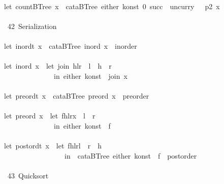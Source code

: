 \documentclass[a4paper]{article}
\begin{document}
\begin{tabbing}
\ttfamily ~\\
\ttfamily ~let~countBTree~x~~cataBTree~either~konst~0~succ~~uncurry~~~p2~x\\
\ttfamily ~\\
\ttfamily ~~42~Serialization~\\
\ttfamily ~\\
\ttfamily ~let~inordt~x~~cataBTree~inord~x~~inorder\\
\ttfamily ~\\
\ttfamily ~let~inord~x~~let~join~hlr~~l~~h~~r\\
\ttfamily ~~~~~~~~~~~~~~~in~either~konst~~join~x\\
\ttfamily ~\\
\ttfamily ~let~preordt~x~~cataBTree~preord~x~~preorder\\
\ttfamily ~\\
\ttfamily ~let~preord~x~~let~fhlrx~~l~~r\\
\ttfamily ~~~~~~~~~~~~~~~in~either~konst~~f\\
\ttfamily ~\\
\ttfamily ~let~postordt~x~~let~fhlrl~~r~~h\\
\ttfamily ~~~~~~~~~~~~~~~~~~in~~cataBTree~either~konst~~f~~postorder\\
\ttfamily ~\\
\ttfamily ~~43~Quicksort~\\

\end{tabbing}
\end{document}
